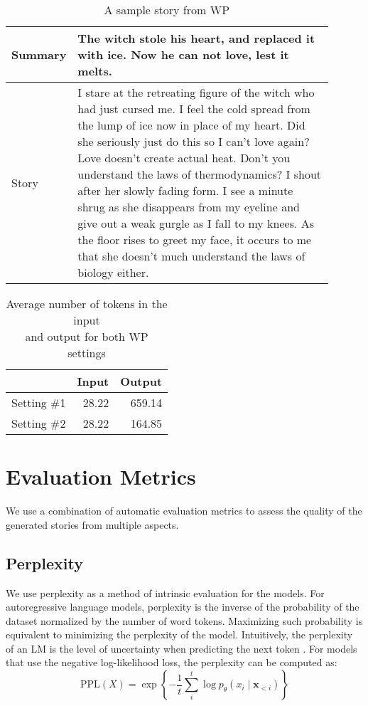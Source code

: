 \begin{table}[ht]
\centering
\begin{tabular}{p{0.1\linewidth} | p{0.8\linewidth}}
Summary  & The witch stole his heart, and replaced it with ice. Now he can not love, lest it melts. \\ \hline
Story & 
I stare at the retreating figure of the witch who had just cursed me. I feel the cold spread from the lump of ice now in place of my heart. Did she seriously just do this so I can't love again? Love doesn't create actual heat. Don't you understand the laws of thermodynamics? I shout after her slowly fading form. I see a minute shrug as she disappears from my eyeline and give out a weak gurgle as I fall to my knees. As the floor rises to greet my face, it occurs to me that she doesn't much understand the laws of biology either. \\
\end{tabular}
\caption{A sample story from WP}
\label{tab:wp-samples}
\end{table}

\begin{table}[ht]
\centering
\begin{tabular}{l|rr}
            & Input & Output \\ \hline
Setting \#1 & 28.22 & 659.14 \\
Setting \#2 & 28.22 & 164.85 \\
\end{tabular}
\caption{Average number of tokens in the input \\ and output for both WP settings}
\label{tab:wp-statistics}
\end{table}



\section{Evaluation Metrics}
\label{sec:eval_metrics}

We use a combination of automatic evaluation metrics to assess the quality of the generated stories from multiple aspects.	

\subsection{Perplexity}
\label{sec:perplexity}

We use perplexity as a method of intrinsic evaluation for the models. For autoregressive language models, perplexity is the inverse of the probability of the dataset normalized by the number of word tokens. Maximizing such probability is equivalent to minimizing the perplexity of the model. Intuitively, the perplexity of an LM is the level of uncertainty when predicting the next token \citep{chip2019evaluation}. For models that use the negative log-likelihood loss, the perplexity can be computed as:
\[ \text{PPL}(X) = \exp \left\{ - \frac{1}{t} \sum_{i}^{t} \log p_{\theta} (x_i \mid \mathbf{x}_{<i})  \right\} \]

